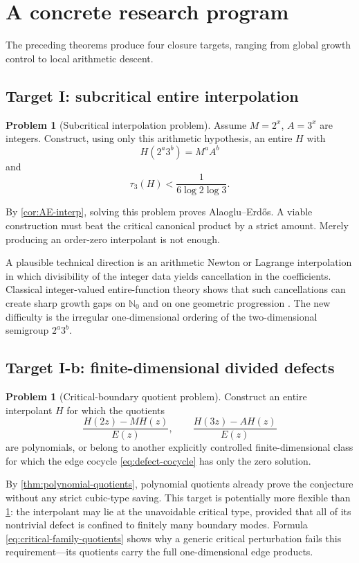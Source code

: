 \documentclass[11pt,oneside]{article}
\theoremstyle{definition}
\newtheorem{problem}[theorem]{Problem}
\theoremstyle{remark}
\newcommand{\Nzero}{\mathbb N_0}
\newcommand{\AEconj}{Alaoglu--Erd\H{o}s}
\begin{document}
\section{A concrete research program}

The preceding theorems produce four closure targets, ranging from global growth control to local arithmetic descent.

\subsection{Target I: subcritical entire interpolation}

\begin{problem}[Subcritical interpolation problem]
\label{prob:subcritical}
Assume \(M=2^x\), \(A=3^x\) are integers.  Construct, using only this arithmetic hypothesis, an entire \(H\) with
\[
  H(2^a3^b)=M^aA^b
\]
and
\[
  \tau_3(H)<\frac1{6\log2\log3}.
\]
\end{problem}

By \cref{cor:AE-interp}, solving this problem proves \AEconj.  A viable construction must beat the critical canonical product by a strict amount.  Merely producing an order-zero interpolant is not enough.

A plausible technical direction is an arithmetic Newton or Lagrange interpolation in which divisibility of the integer data yields cancellation in the coefficients.  Classical integer-valued entire-function theory shows that such cancellations can create sharp growth gaps on \(\Nzero\) and on one geometric progression \cite{Polya1915,PilaRodriguez1999,Pila2003}.  The new difficulty is the irregular one-dimensional ordering of the two-dimensional semigroup \(2^a3^b\).

\subsection{Target I-b: finite-dimensional divided defects}

\begin{problem}[Critical-boundary quotient problem]
\label{prob:quotients}
Construct an entire interpolant \(H\) for which the quotients
\[
  \frac{H(2z)-MH(z)}{E(z)},\qquad
  \frac{H(3z)-AH(z)}{E(z)}
\]
are polynomials, or belong to another explicitly controlled finite-dimensional class for which the edge cocycle \eqref{eq:defect-cocycle} has only the zero solution.
\end{problem}

By \cref{thm:polynomial-quotients}, polynomial quotients already prove the conjecture without any strict cubic-type saving.  This target is potentially more flexible than \cref{prob:subcritical}: the interpolant may lie at the unavoidable critical type, provided that all of its nontrivial defect is confined to finitely many boundary modes.  Formula \eqref{eq:critical-family-quotients} shows why a generic critical perturbation fails this requirement---its quotients carry the full one-dimensional edge products.
\end{document}
